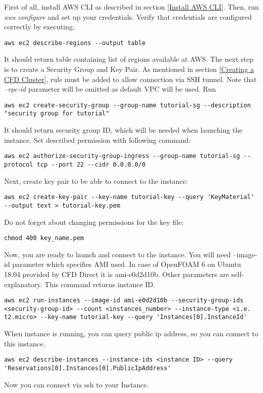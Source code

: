 \documentclass[12pt,english]{article}
\begin{document}
First of all, install AWS CLI as described in section \ref{Install AWS CLI}. Then, run \textit{aws configure} and set up your credentials.
Verify that credentials are configured correctly by executing:
\begin{lstlisting}
aws ec2 describe-regions --output table
\end{lstlisting}
It should return table containing list of regions available at AWS.
The next step is to create a Security Group and Key Pair. As mentioned in section \ref{Creating a CFD Cluster}, rule must be added to allow connection via SSH tunnel. Note that \textit{--vpc-id} parameter will be omitted as default VPC will be used. Run
\begin{lstlisting}
aws ec2 create-security-group --group-name tutorial-sg --description "security group for tutorial"
\end{lstlisting}
It should return security group ID, which will be needed when launching the instance. Set described permission with following command:
\begin{lstlisting}
aws ec2 authorize-security-group-ingress --group-name tutorial-sg --protocol tcp --port 22 --cidr 0.0.0.0/0
\end{lstlisting}
Next, create key pair to be able to connect to the instance:
\begin{lstlisting}
aws ec2 create-key-pair --key-name tutorial-key --query 'KeyMaterial' --output text > tutorial-key.pem
\end{lstlisting}
Do not forget about changing permissions for the key file:
\begin{lstlisting}
chmod 400 key_name.pem
\end{lstlisting}
Now, you are ready to launch and connect to the instance. You will need --image-id parameter which specifies AMI used. In case of OpenFOAM 6 on Ubuntu 18.04 provided by CFD Direct it is ami-e0d2d10b. Other parameters are self-explanatory. This command returns instance ID.
\begin{lstlisting}
aws ec2 run-instances --image-id ami-e0d2d10b --security-group-ids <security-group-id> --count <instances_number> --instance-type <i.e. t2.micro> --key-name tutorial-key --query 'Instances[0].InstanceId'
\end{lstlisting}
When instance is running, you can query public ip address, so you can connect to this instance.
\begin{lstlisting}
aws ec2 describe-instances --instance-ids <instance ID> --query 'Reservations[0].Instances[0].PublicIpAddress'
\end{lstlisting}
Now you can connect via ssh to your Instance.
\end{document}
